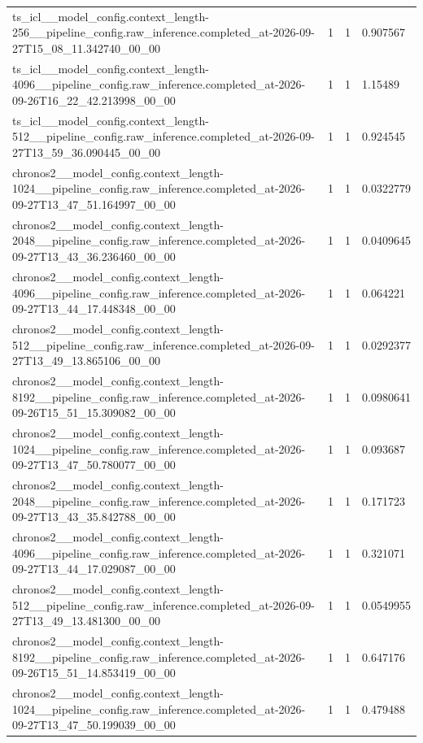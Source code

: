 \begin{tabular}{llll}
ts\_icl\_\_model\_config.context\_length-256\_\_pipeline\_config.raw\_inference.completed\_at-2026-09-27T15\_08\_11.342740\_00\_00 & 1 & 1 & 0.907567 \\
ts\_icl\_\_model\_config.context\_length-4096\_\_pipeline\_config.raw\_inference.completed\_at-2026-09-26T16\_22\_42.213998\_00\_00 & 1 & 1 & 1.15489 \\
ts\_icl\_\_model\_config.context\_length-512\_\_pipeline\_config.raw\_inference.completed\_at-2026-09-27T13\_59\_36.090445\_00\_00 & 1 & 1 & 0.924545 \\
chronos2\_\_model\_config.context\_length-1024\_\_pipeline\_config.raw\_inference.completed\_at-2026-09-27T13\_47\_51.164997\_00\_00 & 1 & 1 & 0.0322779 \\
chronos2\_\_model\_config.context\_length-2048\_\_pipeline\_config.raw\_inference.completed\_at-2026-09-27T13\_43\_36.236460\_00\_00 & 1 & 1 & 0.0409645 \\
chronos2\_\_model\_config.context\_length-4096\_\_pipeline\_config.raw\_inference.completed\_at-2026-09-27T13\_44\_17.448348\_00\_00 & 1 & 1 & 0.064221 \\
chronos2\_\_model\_config.context\_length-512\_\_pipeline\_config.raw\_inference.completed\_at-2026-09-27T13\_49\_13.865106\_00\_00 & 1 & 1 & 0.0292377 \\
chronos2\_\_model\_config.context\_length-8192\_\_pipeline\_config.raw\_inference.completed\_at-2026-09-26T15\_51\_15.309082\_00\_00 & 1 & 1 & 0.0980641 \\
chronos2\_\_model\_config.context\_length-1024\_\_pipeline\_config.raw\_inference.completed\_at-2026-09-27T13\_47\_50.780077\_00\_00 & 1 & 1 & 0.093687 \\
chronos2\_\_model\_config.context\_length-2048\_\_pipeline\_config.raw\_inference.completed\_at-2026-09-27T13\_43\_35.842788\_00\_00 & 1 & 1 & 0.171723 \\
chronos2\_\_model\_config.context\_length-4096\_\_pipeline\_config.raw\_inference.completed\_at-2026-09-27T13\_44\_17.029087\_00\_00 & 1 & 1 & 0.321071 \\
chronos2\_\_model\_config.context\_length-512\_\_pipeline\_config.raw\_inference.completed\_at-2026-09-27T13\_49\_13.481300\_00\_00 & 1 & 1 & 0.0549955 \\
chronos2\_\_model\_config.context\_length-8192\_\_pipeline\_config.raw\_inference.completed\_at-2026-09-26T15\_51\_14.853419\_00\_00 & 1 & 1 & 0.647176 \\
chronos2\_\_model\_config.context\_length-1024\_\_pipeline\_config.raw\_inference.completed\_at-2026-09-27T13\_47\_50.199039\_00\_00 & 1 & 1 & 0.479488 \\

\end{tabular}
